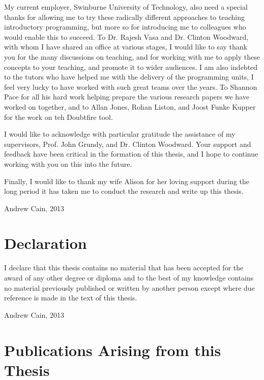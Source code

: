 My current employer, Swinburne University of Technology, also need a special thanks for allowing me to try these radically different approaches to teaching introductory programming, but more so for introducing me to colleagues who would enable this to succeed. To Dr. Rajesh Vasa and Dr. Clinton Woodward, with whom I have shared an office at various stages, I would like to say thank you for the many discussions on teaching, and for working with me to apply these concepts to your teaching, and promote it to wider audiences. I am also indebted to the tutors who have helped me with the delivery of the programming units, I feel very lucky to have worked with such great teams over the years. To Shannon Pace for all his hard work helping prepare the various research papers we have worked on together, and to Allan Jones, Rohan Liston, and Joost Funke Kupper for the work on teh Doubtfire tool. 

I would like to acknowledge with particular gratitude the assistance of my supervisors, Prof. John Grundy, and Dr. Clinton Woodward. Your support and feedback have been critical in the formation of this thesis, and I hope to continue working with you on this into the future.

Finally, I would like to thank my wife Alison for her loving support during the long period it has taken me to conduct the research and write up this thesis.

\vspace*{2cm}
Andrew Cain, 2013


\cleardoublepage

\chapter*{Declaration}
I declare that this thesis contains no material that has been accepted for the award of any other degree or diploma and to the best of my knowledge contains no material previously published or written by another person except where due reference is made in the text of this thesis.

\vspace*{4cm} Andrew Cain, 2013

\cleardoublepage

\chapter*{Publications Arising from this Thesis}
\vspace{-0.5cm}

